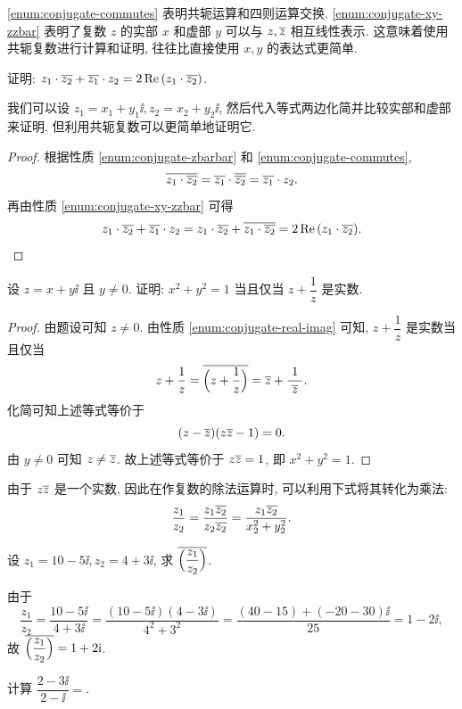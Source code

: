 \ref{enum:conjugate-commutes} 表明共轭运算和四则运算交换.
\ref{enum:conjugate-xy-zzbar} 表明了复数 $z$ 的实部 $x$ 和虚部 $y$ 可以与 $z,\overline z$ 相互线性表示.
这意味着使用共轭复数进行计算和证明, 往往比直接使用 $x,y$ 的表达式更简单.

\begin{example}
  证明: $z_1\cdot\overline{z_2}+\overline{z_1}\cdot z_2=2\operatorname{Re}{(z_1\cdot\overline{z_2})}$.
\end{example}

我们可以设 $z_1=x_1+y_1\ii,z_2=x_2+y_2\ii$, 然后代入等式两边化简并比较实部和虚部来证明.
但利用共轭复数可以更简单地证明它.

\begin{proof}
  根据性质 \ref{enum:conjugate-zbarbar} 和 \ref{enum:conjugate-commutes},
  \[
     \overline{z_1\cdot\overline{z_2}}
    =\overline{z_1}\cdot\overline{\overline{z_2}}
    =\overline{z_1}\cdot z_2.
  \]
  再由性质 \ref{enum:conjugate-xy-zzbar} 可得
  \[
     z_1\cdot\overline{z_2}+\overline{z_1}\cdot z_2
    =z_1\cdot\overline{z_2}+\overline{z_1\cdot\overline{z_2}}
    =2\operatorname{Re}{(z_1\cdot\overline{z_2})}.
  \]
\end{proof}

\begin{example}
  设 $z=x+y\ii$ 且 $y\neq 0$. 证明: $x^2+y^2=1$ 当且仅当 $z+\dfrac1z$ 是实数.
\end{example}
\begin{proof}
  由题设可知 $z\neq 0$.
  由性质 \ref{enum:conjugate-real-imag} 可知, 
  $z+\dfrac1z$ 是实数当且仅当
  \[
     z+\frac1z
    =\overline{\Bigl(z+\frac1z\Bigr)}
    =\overline z+\frac1{~\overline z~}.
  \]
  化简可知上述等式等价于
  \[
    (z-\overline z)(z\overline z-1)=0.
  \]
  由 $y\neq0$ 可知 $z\neq \overline z$.
  故上述等式等价于 $z\overline z=1$, 即 $x^2+y^2=1$.
\end{proof}

由于 $z\overline z$ 是一个实数,
因此在作复数的除法运算时, 可以利用下式将其转化为乘法:
\[
   \frac{z_1}{z_2}
  =\frac{z_1\overline{z_2}}{z_2\overline{z_2}}
  =\frac{z_1\overline{z_2}}{x_2^2+y_2^2}.
\]

\begin{example}
  设 $z_1=10-5\ii,z_2=4+3\ii$, 求 $\overline{\Bigl(\dfrac{z_1}{z_2}\Bigr)}$.
\end{example}

\begin{solution}
  由于
  \[
     \frac{z_1}{z_2}
    =\frac{10-5\ii}{4+3\ii}
    =\frac{(10-5\ii)(4-3\ii)}{4^2+3^2}
    =\frac{(40-15)+(-20-30)\ii}{25}
    =1-2\ii,
  \]
  故 $\overline{\Bigl(\dfrac{z_1}{z_2}\Bigr)}=1+2\mathrm{i}$.
\end{solution}

\begin{exercise}
  计算 $\dfrac{2-3\ii}{2-\ii}=$\fillblank[6em]{}.
\end{exercise}



